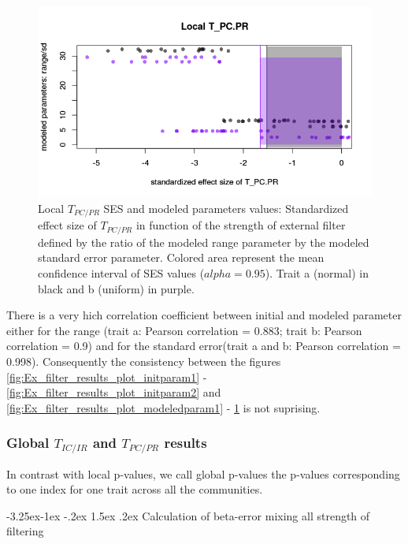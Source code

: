 \documentclass[12pt]{article}\usepackage[]{graphicx}\usepackage[]{color}
\makeatletter
\def\maxwidth{ %
  \ifdim\Gin@nat@width>\linewidth
    \linewidth
  \else
    \Gin@nat@width
  \fi
}
\newenvironment{knitrout}{}{} %
\newcounter {subsubsubsection}[subsubsection]
\newcommand\subsubsubsection{\@startsection{subsubsubsection}{4}{\z@}%
          {-3.25ex\@plus -1ex \@minus -.2ex}%
          {1.5ex \@plus .2ex}%
          {\normalfont\normalsize\bfseries}}
\makeatother
\begin{document}
\begin{knitrout}
\begin{figure}
{\centering \includegraphics[width=\maxwidth]{figure/Ex_filter_results_plot_modeledparam2-1} 

}

\caption[Local $T_{PC/PR}$ SES and modeled parameters values]{Local $T_{PC/PR}$ SES and modeled parameters values: Standardized effect size of $T_{PC/PR}$ in function of the strength of external filter defined by the ratio of the modeled range parameter by the modeled standard error parameter. Colored area represent the mean confidence interval of SES values ($alpha = 0.95$). Trait a (normal) in black and b (uniform) in purple.}\label{fig:Ex_filter_results_plot_modeledparam2}
\end{figure}


\end{knitrout}

There is a very hich correlation coefficient between initial and modeled parameter either for the range (trait a: Pearson correlation = 0.883; trait b: Pearson correlation = 0.9) and for the standard error(trait a and b: Pearson correlation = 0.998). Consequently the consistency between the figures \ref{fig:Ex_filter_results_plot_initparam1} - \ref{fig:Ex_filter_results_plot_initparam2} and \ref{fig:Ex_filter_results_plot_modeledparam1} - \ref{fig:Ex_filter_results_plot_modeledparam2} is not suprising. 
 
 \subsubsection {Global $T_{IC/IR}$ and $T_{PC/PR}$ results}
 
In contrast with local p-values, we call global p-values the p-values corresponding to one index for one trait across all the communities. 
 
  \subsubsubsection {Calculation of beta-error mixing all strength of filtering}
 
\end{document}
